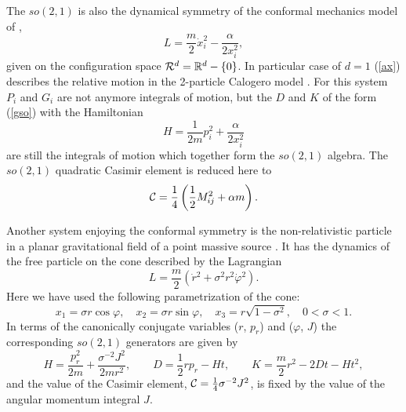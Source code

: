 \documentclass[a4paper,12pt]{article}
\def\R{\mathbb R}
\begin{document}
The $so(2,1)$ is also the dynamical symmetry
of the conformal mechanics model of \cite{AFF},
\begin{equation}
L=\frac{m}{2}\dot{x}_i^2-\frac{\alpha}{2x_i^2},
\label{ax}
\end{equation}
given on the configuration space
${\cal R}^d=\R^{d}-\{0\}$.
In particular case of $d=1$
(\ref{ax})
describes the relative
motion in the
2-particle Calogero model \cite{Calog}.
For this system $P_i$ and $G_i$
are
not anymore integrals of motion, but the
$D$ and $K$
of the form (\ref{gso}) with the Hamiltonian
\begin{equation}
H=\frac{1}{2m}p_i^2+\frac{\alpha}{2x_i^2}
\label{h1r}
\end{equation}
are still the integrals of motion which together
form the $so(2,1)$ algebra.
The $so(2,1)$ quadratic Casimir element
is reduced here
to
\begin{equation}
{\cal C}=\frac{1}{4}\left(\frac{1}{2}M_{ij}^2+\alpha
m\right).
\label{calp}
\end{equation}

Another system enjoying
the conformal symmetry is the
non-relativistic particle
in a planar
gravitational field of a point massive source
\cite{Des}. It
has the dynamics of the
free particle
on the cone
described by the Lagrangian
\begin{equation}
L=\frac{m}{2}(\dot{r}{}^2+
\sigma^2 r^2\dot{\varphi}{}^2).
\label{lcone}
\end{equation}
Here we have used the following
parametrization of the cone:
\begin{equation}
x_1=\sigma r\cos\varphi,\quad
x_2=\sigma r\sin\varphi,\quad
x_3=r\sqrt{1-\sigma^{2}},\quad
0<\sigma<1.
\label{conpar}
\end{equation}
In terms of the canonically conjugate
variables
($r$, $p_r$) and ($\varphi$, $J$)
the corresponding $so(2,1)$ generators  are
given by
\begin{equation}
H=\frac{p_r^2}{2m}+\frac{\sigma^{-2}J^2}{2mr^2},\qquad
D=\frac{1}{2}rp_r-Ht,\qquad
K=\frac{m}{2}r^2-2Dt-Ht^2,
\label{confcone}
\end{equation}
and the value of the Casimir element,
${\cal C}=\frac{1}{4}\sigma^{-2}J^2$,
is fixed  by the value of the angular
momentum integral $J$.
\end{document}
